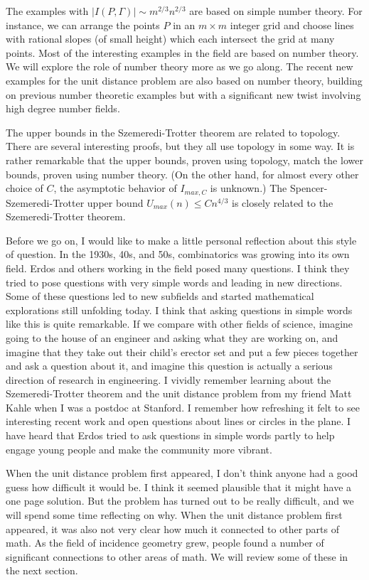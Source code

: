 \documentclass{amsart}
\begin{document}
The examples with  $|I(P,\Gamma)| \sim m^{2/3} n^{2/3}$ are based on simple number theory.   For instance,  we can arrange the points $P$ in an $m \times m$ integer grid and choose lines with rational slopes (of small height) which each intersect the grid at  many points.   Most of the interesting examples in the field are based on number theory.   We will explore the role of number theory more as we go along.   The recent new examples for the unit distance problem are also based on number theory,  building on previous number theoretic examples but with a significant new twist involving high degree number fields.

The upper bounds in the Szemeredi-Trotter theorem are related to topology.   There are several interesting proofs,  but they all use topology in some way.   It is rather remarkable that the upper bounds,  proven using topology,  match the lower bounds,  proven using number theory.    (On the other hand,  for almost every other choice of $C$,  the asymptotic behavior of $I_{max,C}$ is unknown.)   The Spencer-Szemeredi-Trotter upper bound $U_{max}(n) \le C n^{4/3}$ is closely related to the Szemeredi-Trotter theorem.

Before we go on,  I would like to make a little personal reflection about this style of question.   In the 1930s, 40s, and 50s,  combinatorics was growing into its own field.   Erdos and others working in the field posed many questions.   I think they tried to pose questions with very simple words and leading in new directions.  Some of these questions led to new subfields and started mathematical
explorations still unfolding today. I think that asking questions in simple words like this is quite remarkable. If we compare with other fields of science, imagine going to the house of an engineer
and asking what they are working on, and imagine that they take out their child’s erector set and put a few pieces together and ask a question about it, and imagine this question is actually
a serious direction of research in engineering. I vividly remember learning about the Szemeredi-Trotter theorem and the unit distance problem from my friend Matt Kahle when I was a postdoc at Stanford. I remember how refreshing it felt to see interesting recent work and open questions about lines or circles in the plane. I have heard that Erdos tried to ask questions in simple words
partly to help engage young people and make the community more vibrant.

When the unit distance problem first appeared,  I don't think anyone had a good guess how difficult it would be.   I think it seemed plausible that it might have a one page solution.   But the problem has turned out to be really difficult,  and we will spend some time reflecting on why.
When the unit distance problem first appeared,  it was also not very clear how much it connected to other parts of math.   As the field of incidence geometry grew,  people found a number of significant connections to other areas of math.   We will review some of these in the next section.    
\end{document}
